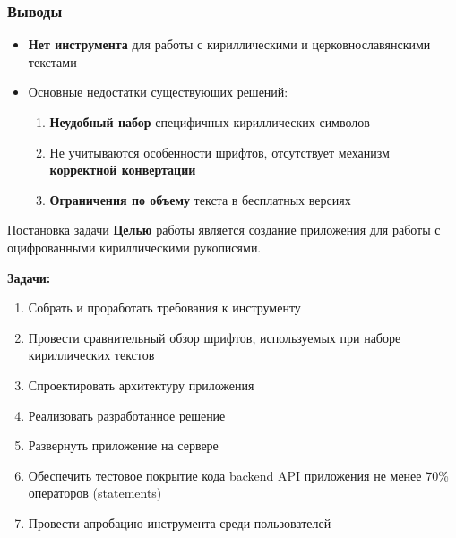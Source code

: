\documentclass
  [ russian
  , aspectratio=1610 %
  ] {beamer}
\begin{document}
\begin{frame}
    \frametitle{Выводы}

    \begin{itemize}
        \item \textbf{Нет инструмента} для работы с кириллическими и церковнославянскими текстами

        \vspace{1em}

        \item Основные недостатки существующих решений:
        \begin{enumerate}
            \item \textbf{Неудобный набор} специфичных кириллических символов
            \item Не учитываются особенности шрифтов, отсутствует механизм \textbf{корректной конвертации}
            \item \textbf{Ограничения по объему} текста в бесплатных версиях
        \end{enumerate}
    \end{itemize}
\end{frame}

\begin{frame}{Постановка задачи}
    \textbf{Целью} работы является создание приложения для работы с оцифрованными кириллическими рукописями.
    \vspace{1em}

    \textbf{Задачи:}
    \begin{enumerate}
        \item Собрать и проработать требования к инструменту
        \item Провести сравнительный обзор шрифтов, используемых при наборе кириллических текстов
        \item Спроектировать архитектуру приложения
        \item Реализовать разработанное решение
        \item Развернуть приложение на сервере
        \item Обеспечить тестовое покрытие кода backend API приложения не менее 70\% операторов (statements)
        \item Провести апробацию инструмента среди пользователей
    \end{enumerate}
\end{frame}
\end{document}
